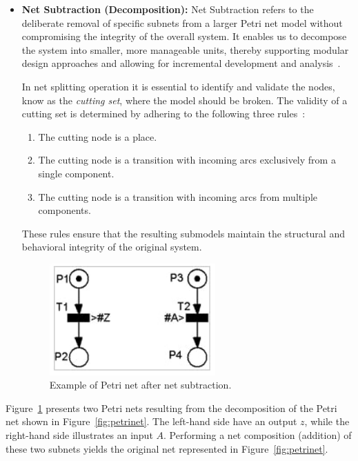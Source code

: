 \begin{itemize}
    \item \textbf{Net Subtraction (Decomposition): }     
Net Subtraction refers to the deliberate removal of specific subnets from a larger Petri net model without compromising the integrity of the overall system. It enables us to decompose the system into smaller, more manageable units, thereby supporting modular design approaches and  allowing for incremental development and analysis~\cite{Barrosadd}. 


In net splitting operation it is essential to identify and validate the nodes, know as the \emph{cutting set}, where the model should be broken. The validity of a cutting set is determined by adhering to the following three rules~\cite{apresentacao}:

\begin{enumerate}
    \item The cutting node is a place.
    \item The cutting node is a transition with incoming arcs exclusively from a single component.
    \item The cutting node is a transition with incoming arcs from multiple components.
\end{enumerate}

These rules ensure that the resulting submodels maintain the structural and behavioral integrity of the original system.



\begin{figure}[htbp]
  \centering
  \includegraphics[width=0.6\textwidth]{Chapters/Figures/petrisplit.jpg}
  \caption{Example of Petri net after net subtraction.}
  \label{fig:petrisplit}
\end{figure}


\end{itemize}


Figure~\ref{fig:petrisplit} presents two Petri nets resulting from the decomposition of the Petri net shown in Figure~\ref{fig:petrinet}. The left-hand side have an output \( z \), while the right-hand side illustrates an input \( A \). Performing a net composition (addition) of these two subnets yields the original net represented in Figure~\ref{fig:petrinet}.


